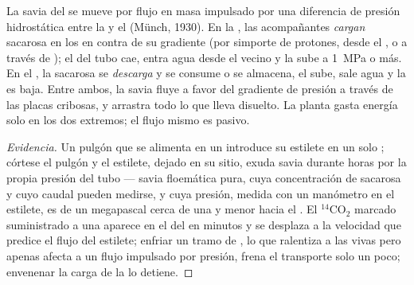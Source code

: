 \begin{theorem}\label{thm:b1:plant-transport:pressureflow}
La savia del  se mueve por flujo en masa impulsado por una diferencia
de presión hidrostática entre la  y el  (Münch, 1930). En la
, las  acompañantes \emph{cargan} sacarosa en los  en contra de su gradiente (por simporte de protones, desde el
, o a través de ); el  del tubo cae,
entra agua desde el  vecino y la  sube a \qty{1}{MPa} o más.
En el , la sacarosa se \emph{descarga} y se consume o se almacena,
el  sube, sale agua y la  es baja. Entre ambos, la
savia fluye a favor del gradiente de presión a través de las placas
cribosas, y arrastra todo lo que lleva disuelto. La planta gasta energía
solo en los dos extremos; el flujo mismo es pasivo.
\end{theorem}
\begin{proof}[Evidencia]
Un pulgón que se alimenta en un  introduce su estilete en un solo ; córtese el pulgón y el estilete, dejado en su sitio, exuda savia
durante horas por la propia presión del tubo --- savia floemática pura,
cuya concentración de sacarosa y cuyo caudal pueden medirse, y cuya presión,
medida con un manómetro en el estilete, es de un megapascal cerca de una
 y menor hacia el . El $\mathrm{^{14}CO_2}$ marcado
suministrado a una  aparece en el  del  en minutos y se
desplaza a la velocidad que predice el flujo del estilete; enfriar un tramo
de , lo que ralentiza a las  vivas pero apenas afecta a un flujo
impulsado por presión, frena el transporte solo un poco; envenenar la carga
de la   lo detiene.
\end{proof}

